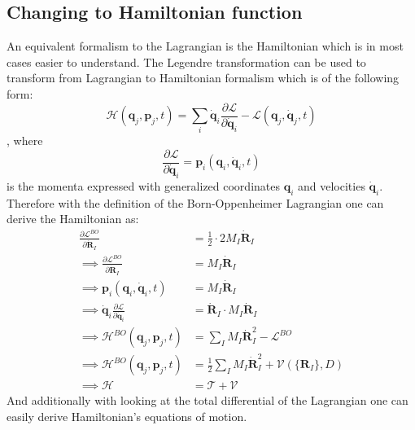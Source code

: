 \documentclass[12pt]{scrartcl}
\begin{document}
\subsection{Changing to Hamiltonian function}
An equivalent formalism to the Lagrangian is the Hamiltonian which is in most cases easier to understand. The Legendre transformation can be used to transform from Lagrangian to Hamiltonian formalism which is of the following form:
\begin{equation}
\mathcal{H}(\mathbf{q}_j,\mathbf{p}_j,t) = \sum_{i} \dot{\mathbf{q}}_i \frac{\partial \mathcal{L}}{\partial \dot{\mathbf{q}}_i} - \mathcal{L}(\mathbf{q}_j,\dot{\mathbf{q}}_j,t)
\end{equation}
, where
\begin{equation}
\frac{\partial \mathcal{L}}{\partial \dot{\mathbf{q}}_i} = \mathbf{p}_i(\mathbf{q}_i,\dot{\mathbf{q}}_i,t)
\end{equation}
is the momenta expressed with generalized coordinates $\mathbf{q}_i$ and velocities $\dot{\mathbf{q}}_i$. Therefore with the definition of the Born-Oppenheimer Lagrangian one can derive the Hamiltonian as:
\begin{align*}
\frac{\partial \mathcal{L}^{BO}}{\partial \dot{\mathbf{R}}_I} &= \frac{1}{2}\cdot 2 M_I \dot{\mathbf{R}}_I\\
\implies \frac{\partial \mathcal{L}^{BO}}{\partial \dot{\mathbf{R}}_I} &=M_I \dot{\mathbf{R}}_I\\
\implies \mathbf{p}_i(\mathbf{q}_i,\dot{\mathbf{q}}_i,t) &= M_I \dot{\mathbf{R}}_I\\
\implies \dot{\mathbf{q}}_i \frac{\partial \mathcal{L}}{\partial \dot{\mathbf{q}}_i} &= \dot{\mathbf{R}}_I \cdot M_I \dot{\mathbf{R}}_I \\
\implies \mathcal{H}^{BO}(\mathbf{q}_j,\mathbf{p}_j,t)&=\sum_{I} M_I \dot{\mathbf{R}}_I^2 - \mathcal{L}^{BO}\\
\implies \mathcal{H}^{BO}(\mathbf{q}_j,\mathbf{p}_j,t)&=\frac{1}{2} \sum_{I} M_I \dot{\mathbf{R}}_I^2+ \mathcal{V}(\{\mathbf{R}_I\},D)\\
\implies \mathcal{H} &= \mathcal{T} + \mathcal{V}
\end{align*}
And additionally with looking at the total differential of the Lagrangian one can easily derive Hamiltonian's equations of motion.
\end{document}
